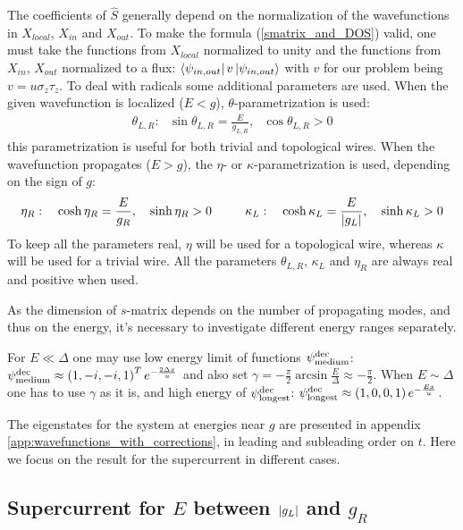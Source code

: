 The coefficients of $ \hat{S} $ generally depend on the normalization of the wavefunctions in $ X_{local} $, $ X_{in}  $ and $ X_{out} $. To make the formula (\ref{smatrix_and_DOS}) valid, one must take the functions from $ X_{local} $ normalized to unity and the functions from $ X_{in}  $, $ X_{out}$ normalized to a flux\cite{Akkermans_Avron_Shapiro_scattering_matrix}: $ \bra{\psi_{in,out}}v \ket{\psi_{in,out}} $ with $ v $ for our problem being $ v=u\sigma_z\tau_z $.
\fi
To deal with radicals some additional parameters are used. When the given wavefunction is localized ($ E<g $), $ \theta $-parametrization is used:
\begin{gather}
\theta_{L,R}:~~~\sin \theta_{L,R} =\frac{E}{g_{L,R}},~~~\cos \theta_{L,R}>0
\end{gather}
this parametrization is useful for both trivial and topological wires. When the wavefunction propagates ($ E>g $), the $ \eta $- or $ \kappa $-parametrization is used, depending on the sign of $ g $:
\begin{gather}
	\eta_R: ~~~\cosh\eta_R = \frac{E}{g_R},~~~\sinh \eta_R >0
	~~~~~~~~
	\kappa_L: ~~~ \cosh\kappa_L= \frac{E}{\left|g_{L}\right|},~~~\sinh \kappa_L>0
\end{gather}
To keep all the parameters real, $ \eta $ will be used for a topological wire, whereas  $ \kappa $ will be used for a trivial wire. All the parameters $ \theta_{L,R}  $,  $\kappa_L $ and $ \eta_R $ are always real and positive when used.

As the dimension of  $ s $-matrix depends on the number of propagating modes, and thus on the energy, it's necessary to investigate different energy ranges separately.

For $ E\ll\Delta $  one may use low energy limit of functions $ \psi_{\mathrm{medium}}^{\mathrm{dec}} $: $ \psi_{\mathrm{medium}}^{\mathrm{dec}} \approx\left(1,-i,-i,1\right)^Te^{-{\frac{2\Delta x}{u}} }$ and also set $ \gamma=-\frac{\pi}{2}\arcsin\frac{E}{\Delta} \approx -\frac{\pi}{2}$. When $ E\sim\Delta $ one has to use $ \gamma $ as it is, and high energy of $ \psi_{\mathrm{longest}}^{\mathrm{dec}} $: $  \psi_{\mathrm{longest}}^{\mathrm{dec}}\approx\left(1,0,0,1\right)e^{-\frac{Ex}{u}}$.

The eigenstates for the system  at energies near $ g $ are presented in appendix \ref{app:wavefunctions_with_corrections}, in leading and subleading order on $ t $. Here we focus on the result for the supercurrent in different cases.

\subsection{ Supercurrent for $ E $ \hspace{0pt} between $ \left|g_L\right| $ and $ g_R $}

